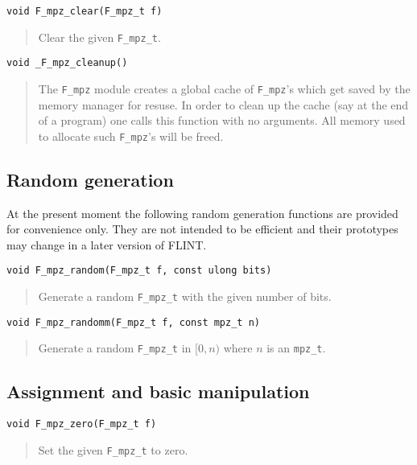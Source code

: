 \documentclass[a4paper,10pt]{article}
\newcommand{\code}{\lstinline}
\begin{document}
\begin{lstlisting}
void F_mpz_clear(F_mpz_t f)
\end{lstlisting}
\begin{quote}
Clear the given \code{F_mpz_t}.
\end{quote}

\begin{lstlisting}
void _F_mpz_cleanup()
\end{lstlisting}
\begin{quote}
The \code{F_mpz} module creates a global cache of \code{F_mpz}'s which get saved by the memory manager for resuse. In order to clean up the cache (say at the end of a program) one calls this function with no arguments. All memory used to allocate such \code{F_mpz}'s will be freed.
\end{quote}

\subsection{Random generation}

At the present moment the following random generation functions are provided for convenience only. They are not intended to be efficient and their prototypes may change in a later version of FLINT.

\begin{lstlisting}
void F_mpz_random(F_mpz_t f, const ulong bits)
\end{lstlisting}
\begin{quote}
Generate a random \code{F_mpz_t} with the given number of bits.
\end{quote}

\begin{lstlisting}
void F_mpz_randomm(F_mpz_t f, const mpz_t n)
\end{lstlisting}
\begin{quote}
Generate a random \code{F_mpz_t} in $[0, n)$ where $n$ is an \code{mpz_t}.
\end{quote}

\subsection{Assignment and basic manipulation}

\begin{lstlisting}
void F_mpz_zero(F_mpz_t f)
\end{lstlisting}
\begin{quote}
Set the given \code{F_mpz_t} to zero.
\end{quote}
\end{document}
